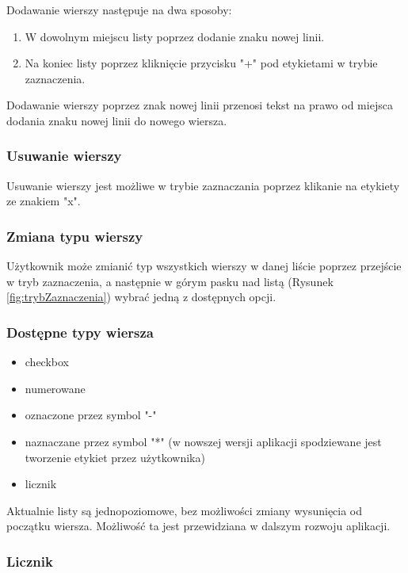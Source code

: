 Dodawanie wierszy następuje na dwa sposoby:

\begin{enumerate}
    \item W dowolnym miejscu listy poprzez dodanie znaku nowej linii.
    \item Na koniec listy poprzez kliknięcie przycisku "+" pod etykietami w trybie zaznaczenia. 
\end{enumerate}

Dodawanie wierszy poprzez znak nowej linii przenosi tekst na prawo od miejsca dodania znaku nowej linii do nowego wiersza.

\subsubsection{Usuwanie wierszy}

Usuwanie wierszy jest możliwe w trybie zaznaczania poprzez klikanie na etykiety ze znakiem "x".

\subsubsection{Zmiana typu wierszy}

Użytkownik może zmianić typ wszystkich wierszy w danej liście poprzez przejście w tryb zaznaczenia, a następnie w górym pasku nad listą (Rysunek \ref{fig:trybZaznaczenia}) wybrać jedną z dostępnych opcji.

\subsubsection{Dostępne typy wiersza}

\begin{itemize}
    \item checkbox
    \item numerowane
    \item oznaczone przez symbol "\--{}"
    \item naznaczane przez symbol "*" (w nowszej wersji aplikacji spodziewane jest tworzenie etykiet przez użytkownika)
    \item licznik
\end{itemize}

Aktualnie listy są jednopoziomowe, bez możliwości zmiany wysunięcia od początku wiersza. Możliwość ta jest przewidziana w dalszym rozwoju aplikacji.

\subsubsection{Licznik}


